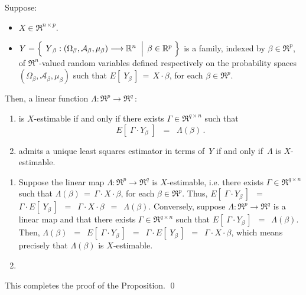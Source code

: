 \begin{proposition}
\mbox{}\vskip 0.1cm\noindent
Suppose:
\begin{itemize}
\item
	$X \in \Re^{n \times p}$.
\item
	$Y = \left\{\;
		\left.
		\overset{{\color{white}.}}{Y}_{\beta} : (\Omega_{\beta},\mathcal{A}_{\beta},\mu_{\beta}) \longrightarrow \Re^{n}
		\;\;\right\vert\;
		\beta \in \Re^{p}
		\;\right\}$
	is a family, indexed by $\beta \in \Re^{p}$,
	of $\Re^{n}$-valued random variables defined respectively on the 
	probability spaces $(\Omega_{\beta},\mathcal{A}_{\beta},\mu_{\beta})$ 
	{\color{red}such that $E\!\left[\;Y_{\beta}\,\right] \,=\, X \cdot \beta$, for each $\beta \in \Re^{p}$}.
\end{itemize}
Then, a linear function $\Lambda : \Re^{p} \longrightarrow \Re^{q}$\,:
\begin{enumerate}
\item
	is $X$-estimable
	if and only if there exists $\Gamma \in \Re^{q \times n}$ such that
	\begin{equation*}
	E\!\left[\;\Gamma \cdot Y_{\beta}\;\right] \;\; = \;\; \Lambda(\beta)\,.
	\end{equation*}
\item
	admits a unique least squares estimator in terms of \,$Y$ if and only if \,$\Lambda$ is $X$-estimable.	
\end{enumerate}
\end{proposition}
\proof
\begin{enumerate}
\item
	Suppose the linear map $\Lambda : \Re^{p} \longrightarrow \Re^{q}$
	is $X$-estimable, i.e. there exists $\Gamma \in \Re^{q \times n}$ such that
	$\Lambda(\beta) \,=\, \Gamma \cdot X \cdot \beta$, for each $\beta \in \Re^{p}$.
	Thus,
	$E\!\left[\;\Gamma \cdot Y_{\beta}\,\right]$
	\,$=$\, $\Gamma \cdot E\!\left[\;Y_{\beta}\,\right]$
	\,$=$\, $\Gamma \cdot X \cdot \beta$
	\,$=$\, $\Lambda(\beta)$.
	Conversely, suppose $\Lambda : \Re^{p} \longrightarrow \Re^{q}$ is a linear map
	and that there exists $\Gamma \in \Re^{q \times n}$ such that $E\!\left[\;\Gamma \cdot Y_{\beta}\,\right]$
	\,$=$\, $\Lambda(\beta)$. Then,
	$\Lambda(\beta)$
	\,$=$\, $E\!\left[\;\Gamma \cdot Y_{\beta}\,\right]$
	\,$=$\, $\Gamma \cdot E\!\left[\;Y_{\beta}\,\right]$
	\,$=$\, $\Gamma \cdot X \cdot \beta$,
	which means precisely that $\Lambda(\beta)$ is $X$-estimable.
\item
\end{enumerate}
This completes the proof of the Proposition.
\qed

